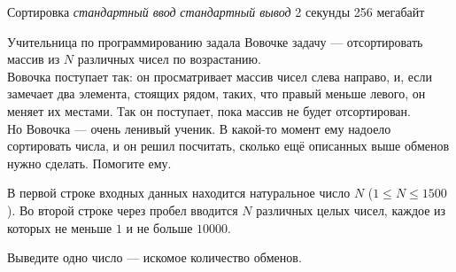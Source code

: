 \begin{problem}%
{Сортировка}%
{\textsl{стандартный ввод}}%
{\textsl{стандартный вывод}}%
{2 секунды}%
{256 мегабайт}{}

Учительница по программированию задала Вовочке задачу — отсортировать массив из $N$ различных чисел по возрастанию.\\

Вовочка поступает так: он просматривает массив чисел слева направо, и, если замечает два элемента, стоящих рядом, таких, что правый меньше левого, он меняет их местами. Так он поступает, пока массив не будет отсортирован.\\

Но Вовочка — очень ленивый ученик. В какой-то момент ему надоело сортировать числа, и он решил посчитать, сколько ещё описанных выше обменов нужно сделать. Помогите ему.

\InputFile

В первой строке входных данных находится натуральное число $N$ ($1 \le N \le 1500$). Во второй строке через пробел вводится $N$ различных целых чисел, каждое из которых не меньше $1$ и не больше $10000$.

\OutputFile

Выведите одно число — искомое количество обменов.

\Examples

\begin{example}
%
%
\end{example}
\end{problem}